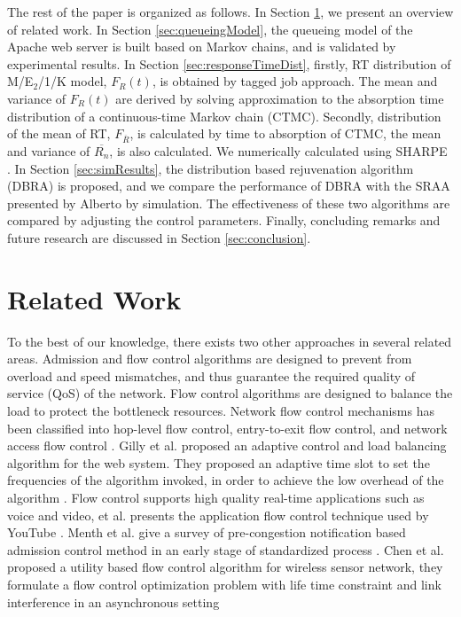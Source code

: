 \documentclass[10pt,journal,letterpaper,compsoc]{IEEEtran}
\begin{document}
The rest of the paper is organized as follows.
In Section \ref{sec:relatedwork}, we 
present an overview of related work.
In Section \ref{sec:queueingModel},
the queueing model of the Apache web server is built based on Markov chains,
and is validated by experimental results.
In Section \ref{sec:responseTimeDist},
firstly, RT distribution of M/E$_2$/1/K model, $F_R(t)$,
is obtained by tagged job approach.
The mean and variance of $F_R(t)$ are derived by solving approximation to
the absorption time distribution of a continuous-time Markov chain (CTMC).
Secondly, distribution of the mean of RT, $F_{\overline{R}}$,
is calculated by time to absorption of CTMC,
the mean and variance of $\overline{R_n}$, is also calculated.
We numerically calculated using SHARPE \cite{ChScience:KSTrivedi2005ACM}.
In Section \ref{sec:simResults},
the distribution based rejuvenation algorithm (DBRA) is proposed,
and we compare the performance of DBRA with the SRAA presented by Alberto by simulation.
The effectiveness of these two algorithms are compared by
adjusting the control parameters.
Finally, concluding remarks and future research are discussed
in Section \ref{sec:conclusion}.

\section{Related Work}
\label{sec:relatedwork}
To the best of our knowledge, there exists two other approaches
in several related areas. Admission and flow control algorithms 
are designed to prevent from overload and speed mismatches, and 
thus guarantee the required quality of service (QoS) of the network. 
Flow control algorithms are designed to balance the load to protect 
the bottleneck resources. Network flow control mechanisms has been 
classified into hop-level flow control, entry-to-exit flow control,
and network access flow control \cite{ChScience:AAvritzer1997ESE}.
Gilly et al. proposed an adaptive control and load balancing algorithm
for the web system. They proposed an adaptive time slot
to set the frequencies of the algorithm invoked, in order to achieve
the low overhead of the algorithm \cite{Gilly2012informationscience}.
Flow control supports high quality real-time applications such as voice 
and video, et al. presents the application flow control technique
used by YouTube \cite{ChScience:SAlcock2011ACMSIGCOMMCCR}.
Menth et al. give a survey of pre-congestion notification based admission
control method in an early stage of standardized process \cite{ChScience:Michael2010IEEEcommunition}.
Chen et al. proposed a utility based flow control algorithm for 
wireless sensor network, they formulate a flow control optimization problem
with life time constraint and link interference in an asynchronous 
setting \cite{ChScience:JChen2010IEEEJournal}
\end{document}
